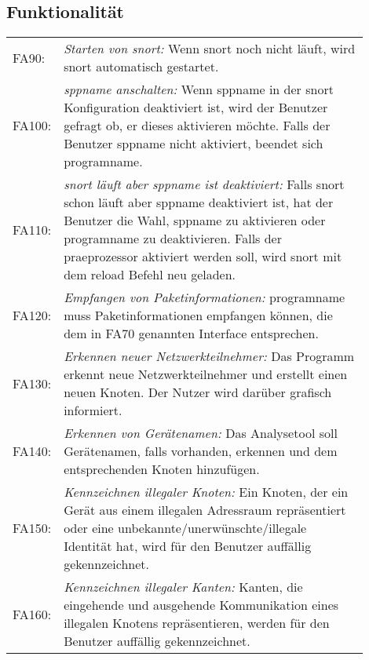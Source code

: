 \subsection{Funktionalität}

\begin{longtable}{lp{0.9\linewidth}}

FA90: & \textit{Starten von \gls{snort}: }Wenn \gls{snort} noch nicht läuft, wird \gls{snort} automatisch gestartet. \\

FA100: & \textit{\gls{sppname} anschalten: }Wenn \gls{sppname} in der \gls{snort} Konfiguration deaktiviert ist, wird der Benutzer gefragt ob, er dieses aktivieren möchte. Falls der Benutzer \gls{sppname} nicht aktiviert, beendet sich \gls{programname}. \\

FA110: & \textit{\gls{snort} läuft aber \gls{sppname} ist deaktiviert: }Falls \gls{snort} schon läuft aber \gls{sppname} deaktiviert ist, hat der Benutzer die Wahl, \gls{sppname} zu aktivieren oder \gls{programname} zu deaktivieren. Falls der \gls{praeprozessor} aktiviert werden soll, wird \gls{snort} mit dem reload Befehl neu geladen.\\

FA120: & \textit{Empfangen von Paketinformationen: }\gls{programname} muss Paketinformationen empfangen können, die dem in FA70 genannten Interface entsprechen. \\

FA130: & \textit{Erkennen neuer Netzwerkteilnehmer: }Das Programm erkennt neue Netzwerkteilnehmer und erstellt einen neuen Knoten. Der Nutzer wird darüber grafisch informiert. \\

FA140: & \textit{Erkennen von Gerätenamen: }Das Analysetool soll Gerätenamen, falls vorhanden, erkennen und dem entsprechenden Knoten hinzufügen. \\

FA150: & \textit{Kennzeichnen illegaler Knoten: }Ein Knoten, der ein Gerät aus einem illegalen Adressraum repräsentiert oder eine unbekannte/unerwünschte/illegale Identität hat, wird für den Benutzer auffällig gekennzeichnet. \\

FA160: & \textit{Kennzeichnen illegaler Kanten: }Kanten, die eingehende und ausgehende Kommunikation eines illegalen Knotens repräsentieren, werden für den Benutzer auffällig gekennzeichnet. \\


\end{longtable}
